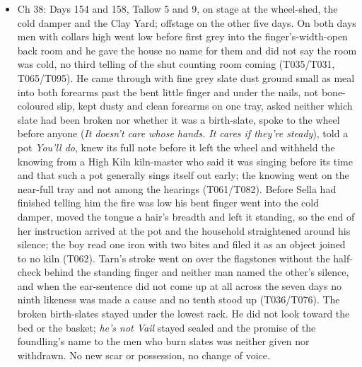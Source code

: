 \documentclass{design/chronicle}
\begin{document}
{\begin{itemize}[leftmargin=1.4em,itemsep=1pt,topsep=3pt,parsep=0pt]
\item Ch 38: Days 154 and 158, Tallow 5 and 9, on stage at the wheel-shed, the cold damper and the Clay Yard; offstage on the other five days. On both days men with collars high went low before first grey into the finger’s-width-open back room and he gave the house no name for them and did not say the room was cold, no third telling of the shut counting room coming (T035/T031, T065/T095). He came through with fine grey slate dust ground small as meal into both forearms past the bent little finger and under the nails, not bone-coloured slip, kept dusty and clean forearms on one tray, asked neither which slate had been broken nor whether it was a birth-slate, spoke to the wheel before anyone (\emph{It doesn’t care whose hands. It cares if they’re steady}), told a pot \emph{You’ll do}, knew its full note before it left the wheel and withheld the knowing from a High Kiln kiln-master who said it was singing before its time and that such a pot generally sings itself out early; the knowing went on the near-full tray and not among the hearings (T061/T082). Before Sella had finished telling him the fire was low his bent finger went into the cold damper, moved the tongue a hair’s breadth and left it standing, so the end of her instruction arrived at the pot and the household straightened around his silence; the boy read one iron with two bites and filed it as an object joined to no kiln (T062). Tarn’s stroke went on over the flagstones without the half-check behind the standing finger and neither man named the other’s silence, and when the ear-sentence did not come up at all across the seven days no ninth likeness was made a cause and no tenth stood up (T036/T076). The broken birth-slates stayed under the lowest rack. He did not look toward the bed or the basket; \emph{he’s not Vail} stayed sealed and the promise of the foundling’s name to the men who burn slates was neither given nor withdrawn. No new scar or possession, no change of voice.

\end{itemize}

\begin{itemize}[leftmargin=1.4em,itemsep=1pt,topsep=3pt,parsep=0pt]


\end{itemize}}
\end{document}
